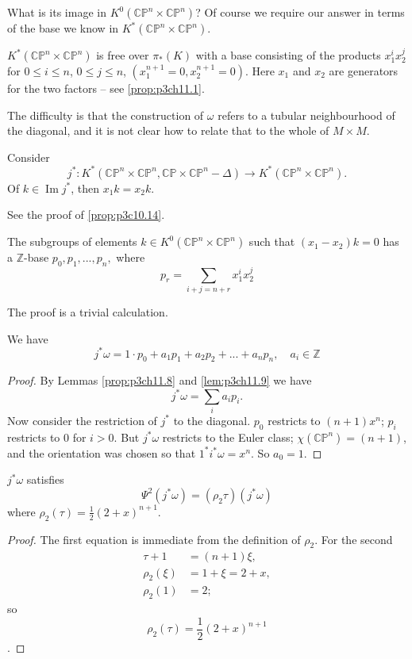 \documentclass[../main]{subfiles}
\begin{document}
What is its image in $K^0(\mathbb{CP}^n\times\mathbb{CP}^n)$? Of course we require our answer in terms of the base we know in $K^*(\mathbb{CP}^n\times\mathbb{CP}^n)$.
\begin{proposition} \label{prop:p3ch11.7}
$K^*(\mathbb{CP}^n\times\mathbb{CP}^n)$ is free over $\pi_*(K)$ with a base consisting of the products $x_1^ix_2^j$ for $0\leq i \leq n$, $0\leq j\leq n$, $(x_1^{n+1}=0, x_2^{n+1}=0)$. Here $x_1$ and $x_2$ are generators for the two factors -- see \ref{prop:p3ch11.1}.
\end{proposition}
\par The difficulty is that the construction of $\omega$ refers to a tubular neighbourhood of the diagonal, and it is not clear how to relate that to the whole of $M\times M$. 
\begin{lemma} \label{prop:p3ch11.8}
Consider $$j^*:K^*(\mathbb{CP}^n \times \mathbb{CP}^n, \mathbb{CP}\times \mathbb{CP}^n - \Delta) \longrightarrow K^*(\mathbb{CP}^n\times \mathbb{CP}^n).$$
Of $k\in\operatorname{Im}j^*$, then $x_1 k = x_2 k$.
\end{lemma}
See the proof of \ref{prop:p3c10.14}.
\begin{lemma} \label{lem:p3ch11.9}
The subgroups of elements $k\in K^0(\mathbb{CP}^n\times \mathbb{CP}^n)$ such that $(x_1-x_2)k=0$ has a $\mathbb{Z}$-base $p_0,p_1,...,p_n,$ where
$$p_r=\sum_{i+j=n+r}x_1^ix_2^j$$
\end{lemma}
\par The proof is a trivial calculation.
\begin{lemma}\label{lem:p3ch11.10}
We have $$j^*\omega=1\cdot p_0+a_1p_1+a_2p_2+...+a_np_n, \quad a_i\in \mathbb{Z}$$
\end{lemma}
\begin{proof}
By Lemmas \ref{prop:p3ch11.8} and \ref{lem:p3ch11.9} we have 
$$j^*\omega=\sum_ia_ip_i.$$
Now consider the restriction of $j^*$ to the diagonal. $p_0$ restricts to $(n+1)x^n$; $p_i$ restricts to $0$ for $i>0$. But $j^*\omega$ restricts to the Euler class; $\chi(\mathbb{CP}^n)=(n+1)$, and the orientation was chosen so that $1^*i^*\omega = x^n$. So $a_0=1$.
\end{proof}
\begin{lemma}\label{lem:p3ch11.11}
$j^*\omega$ satisfies
$$\Psi^2(j^*\omega)=(\rho_2\tau)(j^*\omega)$$
where $\rho_2(\tau)=\frac{1}{2}(2+x)^{n+1}$.
\end{lemma}
\begin{proof}
The first equation is immediate from the definition of $\rho_2$. For the second 
\begin{align}
\tau + 1 &= (n+1)\xi, \nonumber \\
\rho_2(\xi) &= 1+\xi = 2+x, \nonumber \\
\rho_2(1)&=2 \nonumber;
\end{align}
so $$\rho_2(\tau)=\frac{1}{2}(2+x)^{n+1}$$.
\end{proof}
\end{document}
